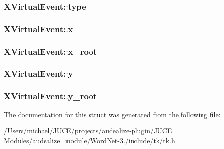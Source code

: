 \subsubsection[{\texorpdfstring{type}{type}}]{ X\+Virtual\+Event\+::type}\hypertarget{struct_x_virtual_event_a46f6ad78d08808570f263d970aeacbc6}{}\label{struct_x_virtual_event_a46f6ad78d08808570f263d970aeacbc6}
\subsubsection[{\texorpdfstring{x}{x}}]{ X\+Virtual\+Event\+::x}\hypertarget{struct_x_virtual_event_a1956d61ba91422712cdf5db29206ffd2}{}\label{struct_x_virtual_event_a1956d61ba91422712cdf5db29206ffd2}
\subsubsection[{\texorpdfstring{x\+\_\+root}{x_root}}]{ X\+Virtual\+Event\+::x\+\_\+root}\hypertarget{struct_x_virtual_event_ad3d8e1e33d3810c1e8a927c1ea875c36}{}\label{struct_x_virtual_event_ad3d8e1e33d3810c1e8a927c1ea875c36}
\subsubsection[{\texorpdfstring{y}{y}}]{ X\+Virtual\+Event\+::y}\hypertarget{struct_x_virtual_event_a417c92c5291f14eb8721f60ac1bf4777}{}\label{struct_x_virtual_event_a417c92c5291f14eb8721f60ac1bf4777}
\subsubsection[{\texorpdfstring{y\+\_\+root}{y_root}}]{ X\+Virtual\+Event\+::y\+\_\+root}\hypertarget{struct_x_virtual_event_adf3f0dd9e602414f1f017c4d4e300e85}{}\label{struct_x_virtual_event_adf3f0dd9e602414f1f017c4d4e300e85}


The documentation for this struct was generated from the following file\+:\begin{DoxyCompactItemize}
\item 
/\+Users/michael/\+J\+U\+C\+E/projects/audealize-\/plugin/\+J\+U\+C\+E Modules/audealize\+\_\+module/\+Word\+Net-\/3./include/tk/\hyperlink{tk_8h}{tk.\+h}\end{DoxyCompactItemize}
